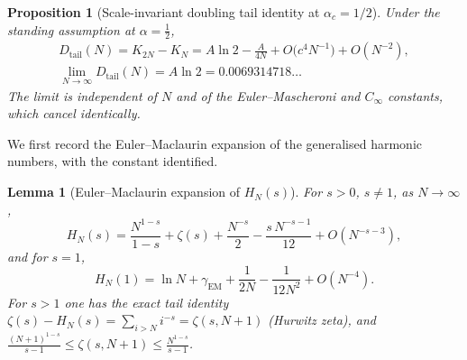 \documentclass[11pt,reqno]{amsart}
\theoremstyle{plain}
\newtheorem{lemma}[theorem]{Lemma}
\newtheorem{proposition}[theorem]{Proposition}
\theoremstyle{definition}
\theoremstyle{remark}
\numberwithin{equation}{section}
\newcommand{\Dtail}{D_{\mathrm{tail}}}
\begin{document}
\begin{proposition}[Scale-invariant doubling tail identity at $\alpha_c=1/2$]\label{prop:doubling}
Under the standing assumption at $\alpha=\tfrac12$,
\begin{equation}\label{eq:doubling}
\begin{gathered}
\Dtail(N)=K_{2N}-K_N=A\ln2-\frac{A}{4N}+O\bigl(c^4N^{-1}\bigr)+O(N^{-2}),\\
\lim_{N\to\infty}\Dtail(N)=A\ln2=0.0069314718\ldots
\end{gathered}
\end{equation}
The limit is independent of $N$ and of the Euler--Mascheroni and $C_\infty$ constants, which cancel identically.
\end{proposition}

We first record the Euler--Maclaurin expansion of the generalised harmonic numbers, with the constant identified.

\begin{lemma}[Euler--Maclaurin expansion of $H_N(s)$]\label{lem:EM}
For $s>0$, $s\ne1$, as $N\to\infty$,
\begin{equation}\label{eq:EMs}
H_N(s)=\frac{N^{1-s}}{1-s}+\zeta(s)+\frac{N^{-s}}{2}-\frac{s\,N^{-s-1}}{12}+O(N^{-s-3}),
\end{equation}
and for $s=1$,
\begin{equation}\label{eq:EM1}
H_N(1)=\ln N+\gamma_{\mathrm{EM}}+\frac1{2N}-\frac1{12N^2}+O(N^{-4}).
\end{equation}
For $s>1$ one has the exact tail identity $\zeta(s)-H_N(s)=\sum_{i>N}i^{-s}=\zeta(s,N+1)$ (Hurwitz zeta), and $\frac{(N+1)^{1-s}}{s-1}\le\zeta(s,N+1)\le\frac{N^{1-s}}{s-1}$.
\end{lemma}
\end{document}
